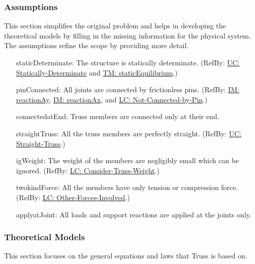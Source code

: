 \documentclass[12pt]{article}
\begin{document}
\subsubsection{Assumptions}
\label{Sec:Assumps}
This section simplifies the original problem and helps in developing the theoretical models by filling in the missing information for the physical system. The assumptions refine the scope by providing more detail.

\begin{itemize}
\item[staticDeterminate:\phantomsection\label{staticDeterminate}]{The  structure is statically determinate. (RefBy: \hyperref[unlikeChgStatD]{UC: Statically-Determinate} and \hyperref[TM:staticEquilibrium]{TM: staticEquilibrium}.)}
\item[pinConnected:\phantomsection\label{pinConnected}]{All joints are connected by frictionless pins. (RefBy: \hyperref[IM:reactionAy]{IM: reactionAy}, \hyperref[IM:reactionAx]{IM: reactionAx}, and \hyperref[likeChgNCbP]{LC: Not-Connected-by-Pin}.)}
\item[connectedatEnd:\phantomsection\label{connectedatEnd}]{Truss members are connected only at their end.}
\item[straightTruss:\phantomsection\label{straightTruss}]{All the truss members are perfectly straight. (RefBy: \hyperref[unlikeChgST]{UC: Straight-Truss}.)}
\item[igWeight:\phantomsection\label{igWeight}]{The weight of the members are negligibly small which can be ignored. (RefBy: \hyperref[likeChgWoT]{LC: Consider-Truss-Weight}.)}
\item[twokindForce:\phantomsection\label{twokindForce}]{All the members have only tension or compression force. (RefBy: \hyperref[likeChgOtherF]{LC: Other-Forces-Involved}.)}
\item[applyatJoint:\phantomsection\label{applyatJoint}]{All loads and support reactions are applied at the joints only.}
\end{itemize}
\subsubsection{Theoretical Models}
\label{Sec:TMs}
This section focuses on the general equations and laws that Truss is based on.
\end{document}
